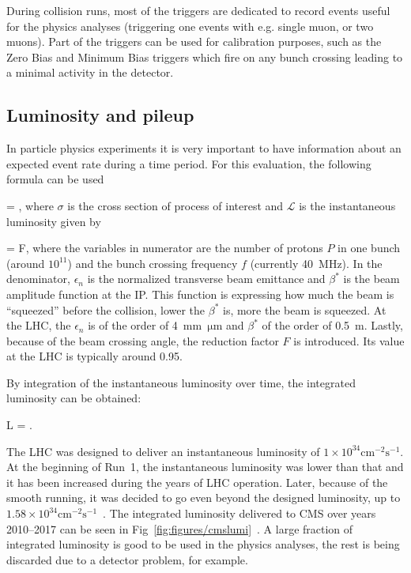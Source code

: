 
During collision runs, most of the triggers are dedicated to record events useful for the physics analyses (triggering one events with e.g. single muon, \MET or two muons). Part of the triggers can be used for calibration purposes, such as the Zero Bias and Minimum Bias triggers which fire on any bunch crossing leading to a minimal activity in the detector.

\subsection{Luminosity and pileup}

In particle physics experiments it is very important to have information about an expected event rate during a time period. For this evaluation, the following formula can be used

{
  = \sigma \times {},
}
where $\sigma$ is the cross section of process of interest and $\mathcal{L}$ is the instantaneous luminosity given by

{
  = F,
}
where the variables in numerator are the number of protons $P$ in one bunch (around $10^{11}$) and the bunch crossing frequency $f$ (currently 40~MHz). In the denominator, $\epsilon_{n}$ is the normalized transverse beam emittance and $\beta^{*}$ is the beam amplitude function at the IP. This function is expressing how much the beam is ``squeezed'' before the collision, lower the $\beta^{*}$ is, more  the beam is squeezed. At the LHC, the  $\epsilon_{n}$ is of the order of 4~mm~$\mathrm{\mu m}$ and $\beta^{*}$ of the order of 0.5~m. Lastly, because of the beam crossing angle, the reduction factor $F$ is introduced. Its value at the LHC is typically around 0.95.

By integration of the instantaneous luminosity over time, the integrated luminosity can be obtained:

{
 L = .
}

The LHC was designed to deliver an instantaneous luminosity of $1 \times 10^{34} \mathrm{cm^{-2}s^{-1}}$. At the beginning of Run~1, the instantaneous luminosity was lower than that and it has been increased during the years of LHC operation. Later, because of the smooth running, it was decided to go even beyond the designed luminosity, up to $1.58 \times 10^{34} \mathrm{cm^{-2}s^{-1}}$~\cite{Pralavorio:2272474}. The integrated luminosity delivered to CMS over years 2010--2017 can be seen in Fig~\ref{fig:figures/cmslumi}~\cite{website:CMSlumi}. A large fraction of integrated luminosity is good to be used in the physics analyses, the rest is being discarded due to a detector problem, for example. 


